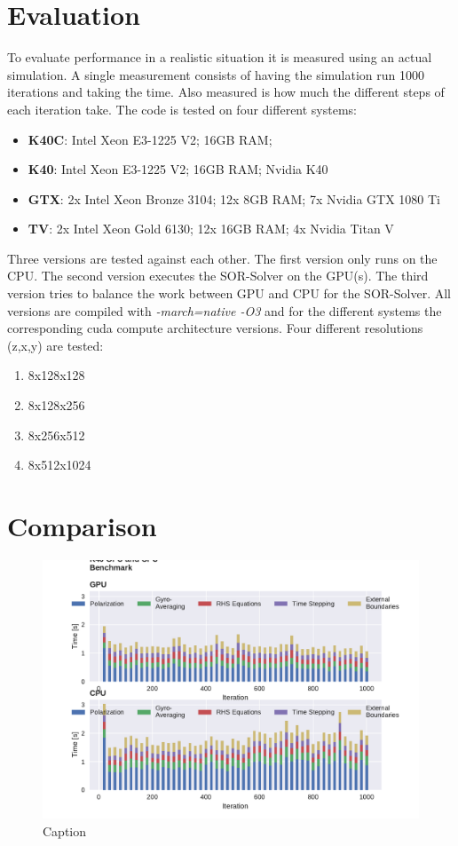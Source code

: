 \section{Evaluation}
To evaluate performance in a realistic situation it is measured using an actual simulation. A single measurement consists of having the simulation run 1000 iterations and taking the time. Also measured is how much the different steps of each iteration take.\newline
The code is tested on four different systems:
\begin{itemize}
    \item \textbf{\ac{K40C}}: Intel Xeon E3-1225 V2; 16GB RAM;
    \item \textbf{\ac{K40}}: Intel Xeon E3-1225 V2; 16GB RAM; Nvidia K40
    \item \textbf{\ac{GTX}}: 2x Intel Xeon Bronze 3104; 12x 8GB RAM; 7x Nvidia GTX 1080 Ti
    \item \textbf{\ac{TV}}: 2x Intel Xeon Gold 6130; 12x 16GB RAM; 4x Nvidia Titan V
\end{itemize}
Three versions are tested against each other. The first version only runs on the CPU. The second version executes the \ac{SOR}-Solver on the GPU(s). The third version tries to balance the work between GPU and CPU for the \ac{SOR}-Solver. All versions are compiled with \textit{-march=native -O3} and for the different systems the corresponding cuda compute architecture versions.  Four different resolutions (z,x,y) are tested:
\begin{enumerate}
    \item 8x128x128
    \item 8x128x256
    \item 8x256x512
    \item 8x512x1024
\end{enumerate}

\section{Comparison}
\begin{figure}[!hbtp]
    \centering
    \includegraphics[width=\linewidth]{pdfs/k40CPUvsGPU_full.pdf}
    \caption{Caption}
    \label{fig:my_label}
\end{figure}

